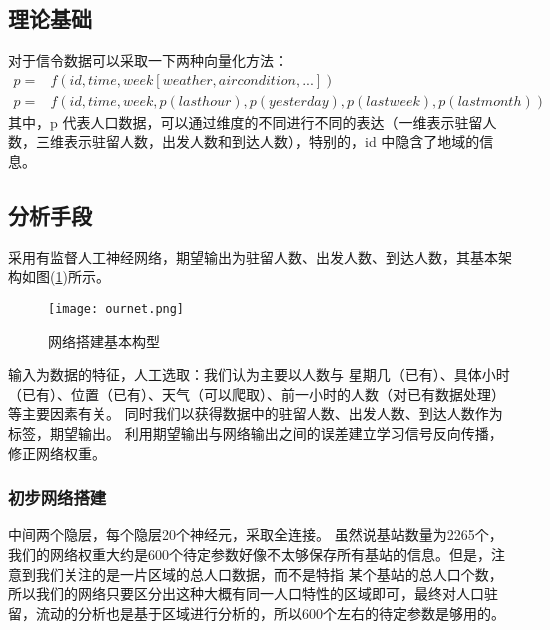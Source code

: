 \subsection{理论基础}
对于信令数据可以采取一下两种向量化方法：
\begin{equation}
\begin{split}
p = & f(id,time,week[weather,air condition,...])\\
p = & f(id,time,week,p(last hour),p(yesterday),p(last week),p(last month))
\end{split}
\end{equation}
其中，p 代表人口数据，可以通过维度的不同进行不同的表达（一维表示驻留人数，三维表示驻留人数，出发人数和到达人数），特别的，id 中隐含了地域的信息。
\subsection{分析手段}
采用有监督人工神经网络，期望输出为驻留人数、出发人数、到达人数，其基本架构如图(\ref{fig:3.1})所示。
\begin{figure}[ht]
\centering
\texttt{[image: ournet.png]}
\caption{网络搭建基本构型}
\label{fig:3.1}
\end{figure}
输入为数据的特征，人工选取：我们认为主要以人数与 星期几（已有）、具体小时（已有）、位置（已有）、天气（可以爬取）、前一小时的人数（对已有数据处理）等主要因素有关。
同时我们以获得数据中的驻留人数、出发人数、到达人数作为标签，期望输出。
利用期望输出与网络输出之间的误差建立学习信号反向传播，修正网络权重。
\subsubsection*{初步网络搭建}
中间两个隐层，每个隐层20个神经元，采取全连接。
虽然说基站数量为2265个，我们的网络权重大约是600个待定参数好像不太够保存所有基站的信息。但是，注意到我们关注的是一片区域的总人口数据，而不是特指
某个基站的总人口个数，所以我们的网络只要区分出这种大概有同一人口特性的区域即可，最终对人口驻留，流动的分析也是基于区域进行分析的，所以600个左右的待定参数是够用的。
